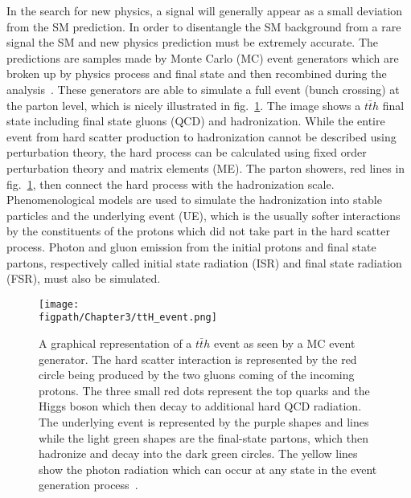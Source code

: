 In the search for new physics, a signal will generally appear as a small deviation from the SM prediction.
In order to disentangle the SM background from a rare signal the SM and new physics prediction must be extremely accurate.
The predictions are samples made by Monte Carlo (MC) event generators which are broken up by physics process and final state and then recombined during the analysis~\cite{Siegert:2010cru,Mangano:2005dj,Dobbs:2004qw}.
These generators are able to simulate a full event (bunch crossing) at the parton level, which is nicely illustrated in fig.~\ref{fig:ttH_event}.
The image shows a $t\bar{t}h$ final state including final state gluons (QCD) and hadronization.
While the entire event from hard scatter production to hadronization cannot be described using perturbation theory, the hard process can be calculated using fixed order perturbation theory and matrix elements (ME).
The parton showers, red lines in fig.~\ref{fig:ttH_event}, then connect the hard process with the hadronization scale.
Phenomenological models are used to simulate the hadronization into stable particles and the underlying event (UE), which is the usually softer interactions by the constituents of the protons which did not take part in the hard scatter process.
Photon and gluon emission from the initial protons and final state partons, respectively called initial state radiation (ISR) and final state radiation (FSR), must also be simulated.

\begin{figure}[!hbt]
    \vspace*{-0.5cm}
    \centering
    \texttt{[image: \\figpath/Chapter3/ttH\_event.png]}
    \caption{A graphical representation of a $t\bar{t}h$ event as seen by a MC event generator. The hard scatter interaction is represented by the red circle being produced by the two gluons coming of the incoming protons. The three small red dots represent the top quarks and the Higgs boson which then decay to additional hard QCD radiation. The underlying event is represented by the purple shapes and lines while the light green shapes are the final-state partons, which then hadronize and decay into the dark green circles. The yellow lines show the photon radiation which can occur at any state in the event generation process~\cite{Siegert:2010cru}.}
    \label{fig:ttH_event}
\end{figure}

